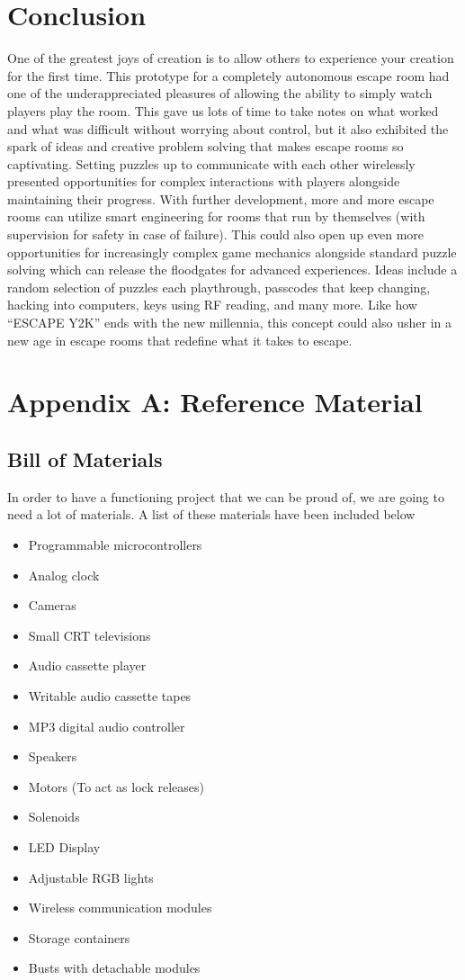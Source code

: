 \documentclass[conference]{IEEEtran}
\begin{document}
\section{Conclusion} %

\indent One of the greatest joys of creation is to allow others to experience your creation for the first time. This prototype
for a completely autonomous escape room had one of the underappreciated pleasures of allowing the ability to simply watch players play the room.
This gave us lots of time to take notes on what worked and what was difficult without worrying about control, but it also exhibited
the spark of ideas and creative problem solving that makes escape rooms so captivating. Setting puzzles up to communicate with each other
wirelessly presented opportunities for complex interactions with players alongside maintaining their progress. With further development, more and more
escape rooms can utilize smart engineering for rooms that run by themselves (with supervision for safety in case of failure). This could also open up
even more opportunities for increasingly complex game mechanics alongside standard puzzle solving which can release the floodgates for advanced experiences. 
Ideas include a random selection of puzzles each playthrough, passcodes that keep changing, hacking into computers, keys using RF reading, and many more.
Like how ``ESCAPE Y2K'' ends with the new millennia, this concept could also usher in a new age in 
escape rooms that redefine what it takes to escape.

\section{Appendix A: Reference Material}

\subsection{Bill of Materials}
In order to have a functioning project that we can be proud of, we are going to need a lot of materials.
A list of these materials have been included below
\begin{itemize}
    \item Programmable microcontrollers
    \item Analog clock
    \item Cameras
    \item Small CRT televisions
    \item Audio cassette player
    \item Writable audio cassette tapes
    \item MP3 digital audio controller
    \item Speakers
    \item Motors (To act as lock releases)
    \item Solenoids
    \item LED Display
    \item Adjustable RGB lights
    \item Wireless communication modules
    \item Storage containers
    \item Busts with detachable modules
\end{itemize}
\end{document}
